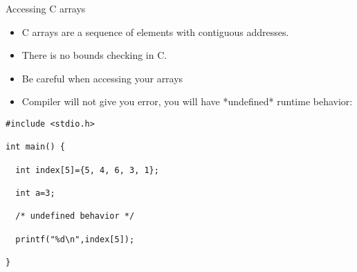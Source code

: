 \documentclass[10pt,t]{beamer}
\begin{document}
\begin{frame}[fragile]{Accessing C arrays}
  \begin{itemize}
  \item C arrays are a sequence of elements with contiguous addresses.
  \item There is no bounds checking in C.
  \item Be careful when accessing your arrays
  \item Compiler will not give you error, you will have *undefined* runtime behavior:
  \end{itemize}
  \begin{lstlisting}
#include <stdio.h>

int main() {
  
  int index[5]={5, 4, 6, 3, 1};
  
  int a=3;
  
  /* undefined behavior */
  
  printf("%d\n",index[5]);
  
}
  \end{lstlisting}
\end{frame}
\end{document}
